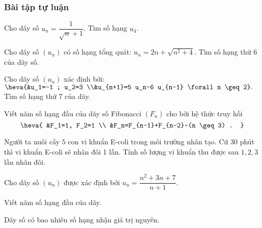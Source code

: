 \subsubsection{Bài tập tự luận}
 
\begin{bt}%
	Cho dãy số $u_n=\dfrac{1}{\sqrt{n}+1}$. Tìm số hạng $u_4$.	
\end{bt}
\begin{bt}%
	Cho dãy số $(u_n)$ có số hạng tổng quát: $u_n=2 n+\sqrt{n^2+4}$. Tìm số hạng thứ $6$ của dãy số.
\end{bt}
\begin{bt}%
	Cho dãy số $(u_n)$ xác định bởi: $\heva{&u_1=-1 ; u_2=3 \\&u_{n+1}=5 u_n-6 u_{n-1} \forall n \geq 2}.$ Tìm số hạng thứ $7$ của dãy.
\end{bt}
\begin{bt}%
	Viết năm số hạng đầu của dãy số Fibonacci $\left(F_n\right)$ cho bởi hệ thức truy hồi
	$$
	\heva{
		&F_1=1, F_2=1 \\
		&F_n=F_{n-1}+F_{n-2}~(n \geq 3) .
	}
	$$
\end{bt}
\begin{bt}%
	Người ta nuôi cấy $5$ con vi khuẩn E-coli trong môi trường nhân tạo. Cứ $30$ phút thì vi khuẩn E-coli sẽ nhân đôi 1 lần. Tính số lượng vi khuẩn thu được sau $1,2,3$ lần nhân đôi.
\end{bt}
\begin{bt}%
	Cho dãy số $(u_n)$ được xác định bởi $u_n=\dfrac{n^2+3n+7}{n+1}$.
	\begin{listEX}
		\item Viết năm số hạng đầu của dãy.
		\item Dãy số có bao nhiêu số hạng nhận giá trị nguyên.
	\end{listEX}
\end{bt}

